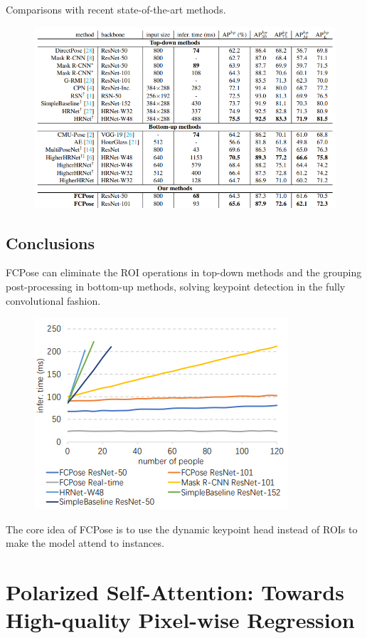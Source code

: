 \documentclass[11pt]{article}
\begin{document}
Comparisons with recent state-of-the-art methods.
\begin{figure}[H]
	\centering
	\includegraphics[scale = 0.5]{16}
\end{figure}
\subsection{Conclusions}
FCPose can eliminate the ROI operations in top-down methods and the grouping post-processing in
bottom-up methods, solving keypoint detection in the fully convolutional fashion.

\begin{figure}[H]
	\centering
	\includegraphics[scale = 0.5]{17}
\end{figure}

The core idea of FCPose is to use the dynamic keypoint head instead of ROIs to make the model attend to instances.
\section{Polarized Self-Attention: Towards High-quality Pixel-wise Regression}
\end{document}

